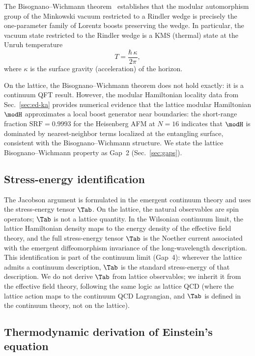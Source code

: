 The Bisognano--Wichmann theorem~\cite{BisognanoWichmann1976}
establishes that the modular automorphism group of the Minkowski vacuum
restricted to a Rindler wedge is precisely the one-parameter family of
Lorentz boosts preserving the wedge.  In particular, the vacuum state
restricted to the Rindler wedge is a KMS (thermal) state at the Unruh
temperature
\begin{equation}
  T = \frac{\hbar\, \kappa}{2\pi},
  \label{eq:unruh}
\end{equation}
where $\kappa$ is the surface gravity (acceleration) of the horizon.

On the lattice, the Bisognano--Wichmann theorem does not hold exactly:
it is a continuum QFT result.  However, the modular Hamiltonian
locality data from Sec.~\ref{sec:ed-ka} provides numerical evidence
that the lattice modular Hamiltonian $\modH$ approximates a local
boost generator near boundaries: the short-range fraction
$\mathrm{SRF} = 0.9993$ for the Heisenberg AFM at $N = 16$ indicates
that $\modH$ is dominated by nearest-neighbor terms localized at the
entangling surface, consistent with the Bisognano--Wichmann structure.
We state the lattice Bisognano--Wichmann property as Gap~2
(Sec.~\ref{sec:gaps}).

\subsection{Stress-energy identification}
\label{sec:stress-energy}

The Jacobson argument is formulated in the emergent continuum theory and
uses the stress-energy tensor $\Tab$.  On the lattice, the natural
observables are spin operators; $\Tab$ is not a lattice quantity.  In the
Wilsonian continuum limit, the lattice Hamiltonian density maps to the
energy density of the effective field theory, and the full
stress-energy tensor $\Tab$ is the Noether current associated with
the emergent diffeomorphism invariance of the long-wavelength
description.  This identification is part of the continuum limit
(Gap~4): wherever the lattice admits a continuum description, $\Tab$
is the standard stress-energy of that description.  We do not derive
$\Tab$ from lattice observables; we inherit it from the effective field
theory, following the same logic as lattice QCD (where the lattice
action maps to the continuum QCD Lagrangian, and $\Tab$ is defined in
the continuum theory, not on the lattice).

\subsection{Thermodynamic derivation of Einstein's equation}
\label{sec:jacobson95}

